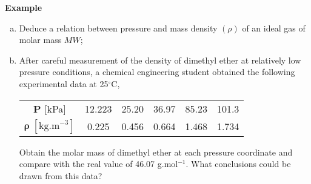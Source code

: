    \begin{MyExample}{\begin{center}{\bf Example}\end{center}}
     \begin{example}\label{Chapter:Intro_Property_of_Gases:Example3}
       \citep{Atkins_Book} 
       \begin{enumerate}[a)]
           \item Deduce a relation between pressure and mass density $\left(\rho\right)$ of an ideal gas of molar mass $MW$;
           \item After careful measurement of the density of dimethyl ether at relatively low pressure conditions, a chemical engineering student obtained the following experimental data at 25$^{\circ}$C,
               \begin{center}
                  \begin{tabular}{c c c c c c}
                     $\mathbf{P}$ [kPa]  & 12.223 & 25.20 & 36.97 & 85.23 & 101.3 \\
                     $\mathbf{\rho}\;\left[\text{kg.m}^{-3}\right]$ & 0.225  &  0.456  &  0.664 & 1.468 & 1.734  
                  \end{tabular}
               \end{center}
               Obtain the molar mass of dimethyl ether at each pressure coordinate and compare with the real value of 46.07 g.mol$^{-1}$. What conclusions could be drawn from this data?
       \end{enumerate}
\medskip


\end{example}
\end{MyExample}
